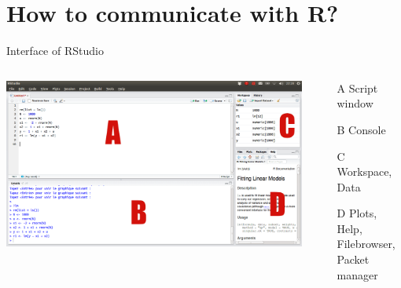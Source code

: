 \documentclass[aspectratio = 169]{chariteBeamer}
\begin{document}
\section{How to communicate with R?}

\begin{frame}{Interface of RStudio}
\begin{columns}[T]
	\begin{column}{0.6\textwidth}
	\includegraphics[scale=0.65]{Rstudio_interface1}
	\end{column}
	\begin{column}{0.4\textwidth}
	\begin{enumerate}
		\item[A] Script window
		\item[B] Console
		\item[C] Workspace, Data
		\item[D] Plots, Help, Filebrowser, Packet manager
	\end{enumerate}
	\end{column}
\end{columns}
\end{frame}
\end{document}
